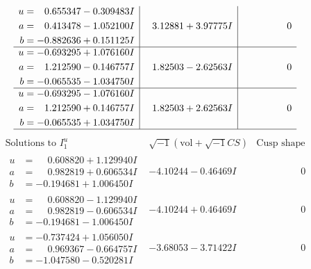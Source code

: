 \documentclass[1p]{elsarticle_modified}
\theoremstyle{definition}
\newcommand{\I}{\sqrt{-1}}
\begin{document}
$$\begin{array}{c|c|c}
\begin{aligned}
u &= \phantom{-}0.655347 - 0.309483 I \\
a &= \phantom{-}0.413478 - 1.052100 I \\
b &= -0.882636 + 0.151125 I\end{aligned}
 & \phantom{-}3.12881 + 3.97775 I & \phantom{-0.000000 } 0 \\ \hline\begin{aligned}
u &= -0.693295 + 1.076160 I \\
a &= \phantom{-}1.212590 - 0.146757 I \\
b &= -0.065535 - 1.034750 I\end{aligned}
 & \phantom{-}1.82503 - 2.62563 I & \phantom{-0.000000 } 0 \\ \hline\begin{aligned}
u &= -0.693295 - 1.076160 I \\
a &= \phantom{-}1.212590 + 0.146757 I \\
b &= -0.065535 + 1.034750 I\end{aligned}
 & \phantom{-}1.82503 + 2.62563 I & \phantom{-0.000000 } 0\\
 \hline 
 \end{array}$$\newpage$$\begin{array}{c|c|c}  
\text{Solutions to }I^u_{1}& \I (\text{vol} + \sqrt{-1}CS) & \text{Cusp shape}\\
 \hline 
\begin{aligned}
u &= \phantom{-}0.608820 + 1.129940 I \\
a &= \phantom{-}0.982819 + 0.606534 I \\
b &= -0.194681 + 1.006450 I\end{aligned}
 & -4.10244 - 0.46469 I & \phantom{-0.000000 } 0 \\ \hline\begin{aligned}
u &= \phantom{-}0.608820 - 1.129940 I \\
a &= \phantom{-}0.982819 - 0.606534 I \\
b &= -0.194681 - 1.006450 I\end{aligned}
 & -4.10244 + 0.46469 I & \phantom{-0.000000 } 0 \\ \hline\begin{aligned}
u &= -0.737424 + 1.056050 I \\
a &= \phantom{-}0.969367 - 0.664757 I \\
b &= -1.047580 - 0.520281 I\end{aligned}
 & -3.68053 - 3.71422 I & \phantom{-0.000000 } 0 \\ \hline\begin{aligned}

\end{aligned}
\end{array}$$
\end{document}
